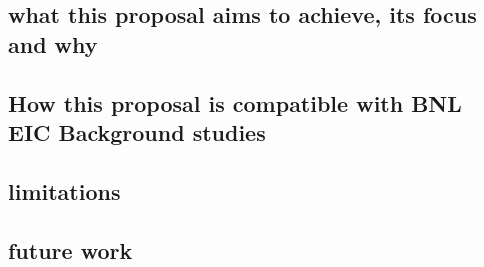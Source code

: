 \subsection{what this proposal aims to achieve, its focus and why}

\subsection{How this proposal is compatible with BNL EIC Background studies}

\subsection{limitations}

\subsection{future work}
